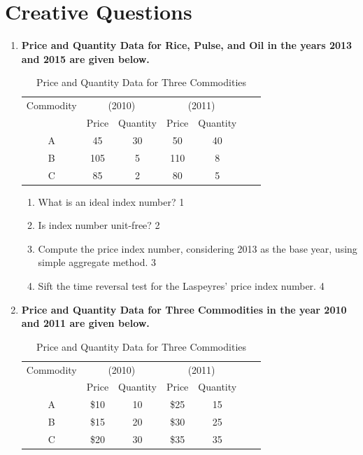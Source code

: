 \documentclass[a4paper,oneside]{book}
\begin{document}
\section{Creative Questions}
  \begin{enumerate}
  
 \item
  \textbf{Price and Quantity Data for Rice, Pulse, and Oil in the years 2013 and 2015 are given below.}
  
  \begin{table}[h]
\centering
\begin{tabular}{ccccccc}
\hline
Commodity & \multicolumn{2}{c}{(2010)} & \multicolumn{2}{c}{(2011)}  \\
& Price & Quantity & Price & Quantity\\
\hline
A & 45 & 30 & 50 & 40  \\
B & 105 & 5 & 110 & 8  \\
C & 85 & 2 & 80 & 5 \\
\hline
\end{tabular}
\caption{Price and Quantity Data for Three Commodities}
\label{tab:price_quantity}
\end{table}

  
  \begin{enumerate}
    \item
	What is an ideal index number? \hfill 1
    \item
	Is index number unit-free? \hfill 2
    \item  
	Compute the price index number, considering 2013 as the base year, using simple aggregate method. \hfill 3
    \item
	Sift the time reversal test for the Laspeyres' price index number.  \hfill 4
  \end{enumerate}  
  
 \item
 
  \textbf{Price and Quantity Data for Three Commodities in the year 2010 and 2011 are given below.}
  
  \begin{table}[h]
\centering
\begin{tabular}{ccccccc}
\hline
Commodity & \multicolumn{2}{c}{(2010)} & \multicolumn{2}{c}{(2011)}  \\
& Price & Quantity & Price & Quantity\\
\hline
A & \$10 & 10 & \$25 & 15  \\
B & \$15 & 20 & \$30 & 25  \\
C & \$20 & 30 & \$35 & 35 \\
\hline
\end{tabular}
\caption{Price and Quantity Data for Three Commodities}
\label{tab:price_quantity}
\end{table}


\end{enumerate}
\end{document}
